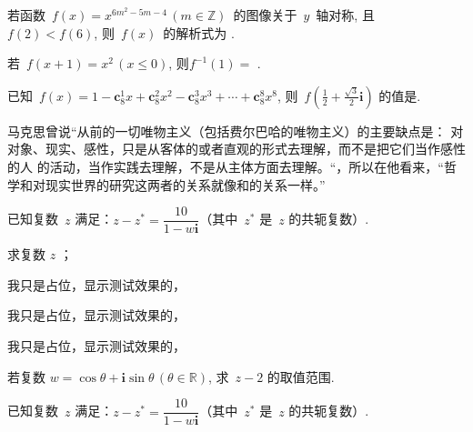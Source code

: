 \documentclass[a4paper, zihao = 5, unicodeGBMath, %
]{ctexart}
\begin{document}

\begin{qus}
  
\item 若函数~$f(x)=x^{6m^2-5m-4}\,(m\in\mathbb{Z})$~的图像关于~$y$~轴对称,
  且~$f(2)<f(6)$, 则~$f(x)$~的解析式为 .

\item 若~$f(x+1)=x^2\,(x\leq0)$, 则$f^{-1}(1)=$ .

\item 已知~$f(x)=1-\textbf{c}_8^1x+\textbf{c}_8^2x^2-\textbf{c}_8^3x^3+\cdots+\textbf{c}_8^8x^8$,
  则~$f\left(\tfrac{1}{2}+\tfrac{\sqrt{3}}{2}\textbf{i}\right)$ 的值是.

\item 马克思曾说“从前的一切唯物主义（包括费尔巴哈的唯物主义）的主要缺点是：
  对对象、现实、感性，只是从客体的或者直观的形式去理解，而不是把它们当作感性的人
  的活动，当作实践去理解，不是从主体方面去理解。“，所以在他看来，“哲学和对现实世界的研究这两者的关系就像和的关系一样。”

\end{qus}

\clearpage


\begin{qus}
  
\item 已知复数~$z$ 满足：${z}-z^*=\dfrac{10}{1-w\textbf{i}}$（其中~$z^*$
  是~$z$ 的共轭复数）.

  \begin{qus}
  \item 求复数 $z$ ；
    \begin{qus}
    \item 我只是占位，显示测试效果的，
    \item 我只是占位，显示测试效果的，
    \item 我只是占位，显示测试效果的，
    \end{qus}
  \item 若复数 $w=\cos\theta+\textbf{i}\sin\theta\,(\theta\in\mathbb{R})$, 求~${z-2}$ 的取值范围.
  \end{qus}


  \vspace*{7cm}


\item 已知复数~$z$ 满足：${z}-z^*=\dfrac{10}{1-w\textbf{i}}$（其中~$z^*$
  是~$z$ 的共轭复数）.

  \solution{}

  \vspace*{4cm}
\end{qus}
\end{document}
